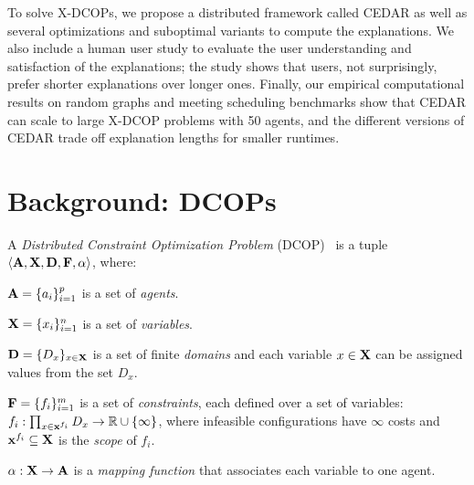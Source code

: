 \documentclass[twoside,11pt]{article}
\begin{document}
To solve X-DCOPs, we propose a distributed framework called CEDAR as well as several optimizations and suboptimal variants to compute the explanations. We also include a human user study to evaluate the user understanding and satisfaction of the explanations; the study shows that users, not surprisingly, prefer shorter explanations over longer ones. Finally, our empirical computational results on random graphs and meeting scheduling benchmarks show that CEDAR can scale to large X-DCOP problems with 50 agents, and the different versions of CEDAR trade off explanation lengths for smaller runtimes. 


\section{Background: DCOPs}

A \emph{Distributed Constraint Optimization Problem} (DCOP)~\cite{modi:05,petcu:05,fioretto:18} is a tuple  
$\langle {\bf{A}}, {\bf{X}}, {\bf{D}}, {\bf{F}}, \alpha \rangle$, where: 
\squishlist
\item ${\bf{A}} = \{a_i\}_{i=1}^p$ is a set of \emph{agents}. 
\item ${\bf{X}} = \{x_i\}_{i=1}^n$ is a set of \emph{variables}. 
\item ${\bf{D}} = \{D_x\}_{x \in {\bf{X}}}$ is a set of finite \emph{domains} and each variable $x \in {\bf{X}}$ can be assigned values from the set $D_{x}$. 
\item ${\bf{F}} = \{f_i\}_{i=1}^m$ is a set of \emph{constraints}, each defined over a set of variables: $ f_i : \prod_{x \in \mathbf{x}^{f_i}} D_x \to \mathbb{R} \cup \{\infty\}$, where infeasible configurations have $\infty$ costs and $\mathbf{x}^{f_i} \subseteq {\bf{X}}$ is the \emph{scope} of $f_i$. 
\item $\alpha : {\bf{X}} \to {\bf{A}}$ is a \emph{mapping function} that associates each variable to one agent. 
\squishend
\end{document}
